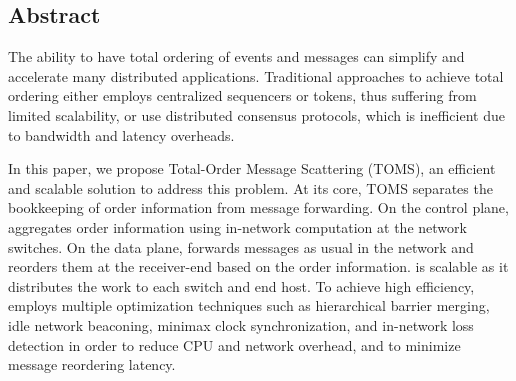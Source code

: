 \subsection*{Abstract}

The ability to have total ordering of events and messages can simplify and accelerate many distributed applications. Traditional approaches to achieve total ordering either employs centralized sequencers or tokens, thus suffering from limited scalability, or use distributed consensus protocols, which is inefficient due to bandwidth and latency overheads.

In this paper, we propose Total-Order Message Scattering (TOMS), an efficient and scalable solution to address this problem. At its core, TOMS separates the bookkeeping of order information from message forwarding. On the control plane, \sys aggregates order information using in-network computation at the network switches. On the data plane, \sys forwards messages as usual in the network and reorders them at the receiver-end based on the order information. \sys is scalable as it distributes the work to each switch and end host. To achieve high efficiency, \sys employs multiple optimization techniques such as hierarchical barrier merging, idle network beaconing, minimax clock synchronization, and in-network loss detection in order to reduce CPU and network overhead, and to minimize message reordering latency.





